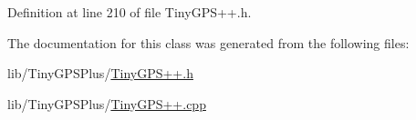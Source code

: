 Definition at line 210 of file Tiny\+G\+P\+S++.\+h.



The documentation for this class was generated from the following files\+:\begin{DoxyCompactItemize}
\item 
lib/\+Tiny\+G\+P\+S\+Plus/\hyperlink{_tiny_g_p_s_09_09_8h}{Tiny\+G\+P\+S++.\+h}\item 
lib/\+Tiny\+G\+P\+S\+Plus/\hyperlink{_tiny_g_p_s_09_09_8cpp}{Tiny\+G\+P\+S++.\+cpp}\end{DoxyCompactItemize}
